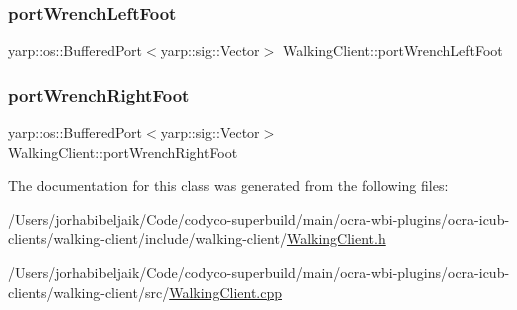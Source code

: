 \subsubsection{\texorpdfstring{port\+Wrench\+Left\+Foot}{portWrenchLeftFoot}}
{\footnotesize\ttfamily yarp\+::os\+::\+Buffered\+Port$<$yarp\+::sig\+::\+Vector$>$ Walking\+Client\+::port\+Wrench\+Left\+Foot}

\hypertarget{classWalkingClient_a96321dc60e84c193f2dea6e85983ca67}{}\label{classWalkingClient_a96321dc60e84c193f2dea6e85983ca67} 
\subsubsection{\texorpdfstring{port\+Wrench\+Right\+Foot}{portWrenchRightFoot}}
{\footnotesize\ttfamily yarp\+::os\+::\+Buffered\+Port$<$yarp\+::sig\+::\+Vector$>$ Walking\+Client\+::port\+Wrench\+Right\+Foot}



The documentation for this class was generated from the following files\+:\begin{DoxyCompactItemize}
\item 
/\+Users/jorhabibeljaik/\+Code/codyco-\/superbuild/main/ocra-\/wbi-\/plugins/ocra-\/icub-\/clients/walking-\/client/include/walking-\/client/\hyperlink{WalkingClient_8h}{Walking\+Client.\+h}\item 
/\+Users/jorhabibeljaik/\+Code/codyco-\/superbuild/main/ocra-\/wbi-\/plugins/ocra-\/icub-\/clients/walking-\/client/src/\hyperlink{WalkingClient_8cpp}{Walking\+Client.\+cpp}\end{DoxyCompactItemize}
